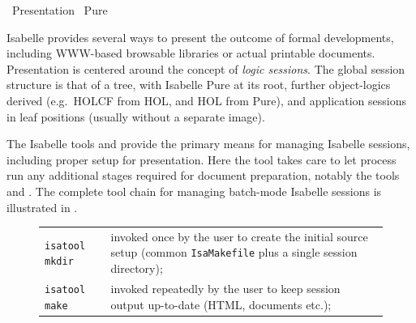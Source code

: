 %
\begin{isabellebody}%
\def\isabellecontext{Presentation}%
%
\isadelimtheory
\isanewline
\isanewline
%
\endisadelimtheory
%
\isatagtheory
{}\isamarkupfalse%
\ Presentation\isanewline
{}\ Pure\isanewline
{}%
\endisatagtheory
{\isafoldtheory}%
%
\isadelimtheory
%
\endisadelimtheory
%
\isamarkuptrue%
%
\begin{isamarkuptext}%
Isabelle provides several ways to present the outcome of formal
  developments, including WWW-based browsable libraries or actual
  printable documents.  Presentation is centered around the concept of
  \emph{logic sessions}.  The global session structure is that of a
  tree, with Isabelle Pure at its root, further object-logics derived
  (e.g.\ HOLCF from HOL, and HOL from Pure), and application sessions
  in leaf positions (usually without a separate image).

  The Isabelle tools \hyperlink{tool.mkdir}{\mbox{}} and \hyperlink{tool.make}{\mbox{}} provide
  the primary means for managing Isabelle sessions, including proper
  setup for presentation.  Here the \hyperlink{tool.usedir}{\mbox{}} tool takes care
  to let \hyperlink{executable.isabelle-process}{\mbox{}} process run any
  additional stages required for document preparation, notably the
  tools \hyperlink{tool.document}{\mbox{}} and \hyperlink{tool.latex}{\mbox{}}.  The complete tool
  chain for managing batch-mode Isabelle sessions is illustrated in
  .

  \begin{figure}[htbp]
  \begin{center}
  \begin{tabular}{lp{}}

      \verb|isatool mkdir| & invoked once by the user to create
      the initial source setup (common \verb|IsaMakefile| plus a
      single session directory); \\

      \verb|isatool make| & invoked repeatedly by the user to
      keep session output up-to-date (HTML, documents etc.); \\


\end{tabular}
\end{center}
\end{figure}
\end{isamarkuptext}
\end{isabellebody}
